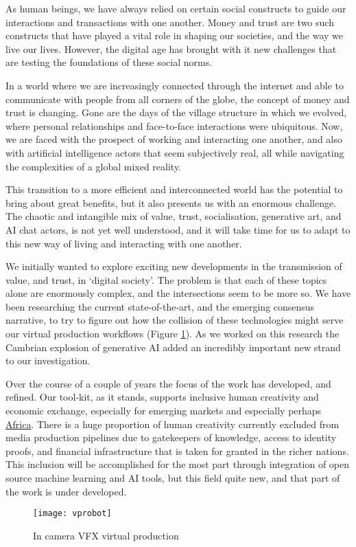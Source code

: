 As human beings, we have always relied on certain social constructs to guide our interactions and transactions with one another. Money and trust are two such constructs that have played a vital role in shaping our societies, and the way we live our lives. However, the digital age has brought with it new challenges that are testing the foundations of these social norms.\par
In a world where we are increasingly connected through the internet and able to communicate with people from all corners of the globe, the concept of money and trust is changing. Gone are the days of the village structure in which we evolved, where personal relationships and face-to-face interactions were ubiquitous. Now, we are faced with the prospect of working and interacting one another, and also with artificial intelligence actors that seem subjectively real, all while navigating the complexities of a global mixed reality.\par
This transition to a more efficient and interconnected world has the potential to bring about great benefits, but it also presents us with an enormous challenge. The chaotic and intangible mix of value, trust, socialisation, generative art, and AI chat actors, is not yet well understood, and it will take time for us to adapt to this new way of living and interacting with one another.\par
We initially wanted to explore exciting new developments in the transmission of value, and trust, in `digital society'. The problem is that each of these topics alone are enormously complex, and the intersections seem to be more so. We have been researching the current state-of-the-art, and the emerging consensus narrative, to try to figure out how the collision of these technologies might serve our virtual production workflows (Figure \ref{fig:vprobot}). As we worked on this research the Cambrian explosion of generative AI added an incredibly important new strand to our investigation.\par
Over the course of a couple of years the focus of the work has developed, and refined. Our tool-kit, as it stands, supports inclusive human creativity and economic exchange, especially for emerging markets and especially perhaps \href{https://www.afrobitcoin.org/}{Africa}. There is a huge proportion of human creativity currently excluded from media production pipelines due to gatekeepers of knowledge, access to identity proofs, and financial infrastructure that is taken for granted in the richer nations. This inclusion will be accomplished for the most part through integration of open source machine learning and AI tools, but this field quite new, and that part of the work is under developed.\par

\begin{figure}
  \centering
   \texttt{[image: vprobot]}
 \caption{In camera VFX virtual production}
    \label{fig:vprobot}
\end{figure}

